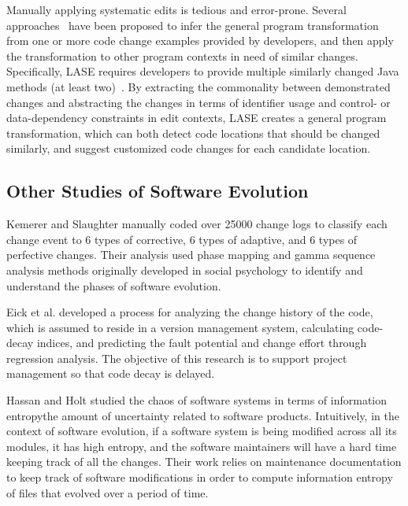 \documentclass[runningheads,a4paper]{llncs}
\begin{document}
Manually applying systematic edits is tedious and error-prone. 
Several approaches~\cite{MKM2011,MKM2013,Rolim:2017} have been proposed to infer the general program transformation from one or more code change examples provided by developers, and then apply the transformation to other program contexts in need of similar changes. Specifically, LASE requires developers to provide multiple similarly changed Java methods (at least two)~\cite{MKM2013}. By extracting the commonality between demonstrated changes and abstracting the changes in terms of identifier usage and control- or data-dependency constraints in edit contexts, LASE creates a general program transformation, which can both detect code locations that should be changed similarly, and suggest customized code changes for each candidate location.


\subsection{Other Studies of Software Evolution} 
Kemerer and Slaughter \cite{Kemerer1999} manually coded over 25000 change logs to classify each change event to 6 types of corrective, 6 types of adaptive, and 6 types of perfective changes. Their analysis used phase mapping and gamma sequence analysis methods originally developed in social psychology to identify and understand the phases of software evolution. 

Eick et al. \cite{Eick2001} developed a process for analyzing the change history of the code, which is assumed to reside in a version management system, calculating code-decay indices, and predicting the fault potential and change effort through regression analysis. The objective of this research is to support project management so that code decay is delayed. 

Hassan and Holt \cite{Hassan2003} studied the chaos of software systems in terms of information entropy\textemdash the amount of uncertainty related to software products. Intuitively, in the context of software evolution, if a software system is being modified across all its modules, it has high entropy, and the software maintainers will have a hard time keeping track of all the changes. Their work relies on maintenance documentation to keep track of software modifications in order to compute information entropy of files that evolved over a period of time. 
\end{document}
